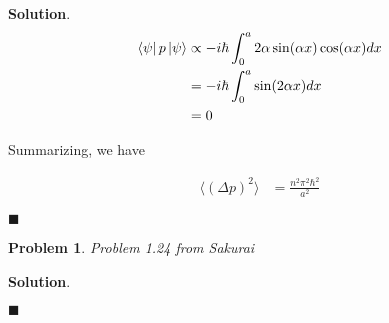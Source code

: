 \documentclass[12pt]{article}
\newtheorem{p}{Problem}
\theoremstyle{definition}
\newenvironment{s}{%
        \begin{trivlist} \item \textbf{Solution}. }{%
            \hspace*{\fill} $\blacksquare$\end{trivlist}}%
\begin{document}
{\begin{s}
\begin{align*}
\bra{\psi} p \ket{\psi} &\propto -i\hbar \int_{0}^{a} 2\alpha\sin(\alpha x)\cos(\alpha x)dx\\
&= -i\hbar \int_{0}^{a} \sin(2\alpha x)dx\\
&= 0
\end{align*}

Summarizing, we have

\begin{align*}
\langle (\Delta p)^{2}\rangle &= \frac{n^{2}\pi^{2}\hbar^{2}}{a^{2}}
\end{align*}



\end{s}

\begin{p}
Problem 1.24 from Sakurai
\end{p}

\begin{s} 

\end{s}
\end{document}
